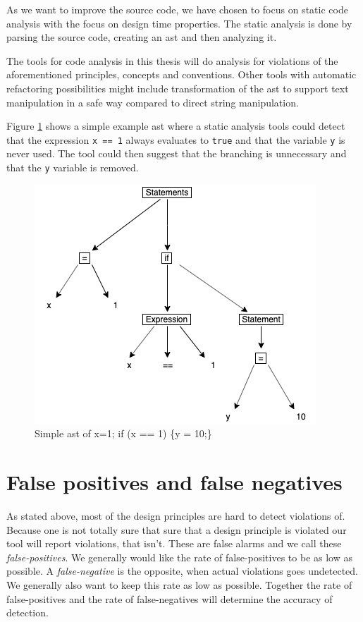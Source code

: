\documentclass{report}
\begin{document}
As we want to improve the source code, we have chosen to focus on static code analysis with the focus on design time properties. The static analysis is done by parsing the source code, creating an \gls{ast} and then analyzing it.


The tools for code analysis in this thesis will do analysis for violations of the aforementioned principles, concepts and conventions. Other tools with automatic refactoring possibilities might include transformation of the \gls{ast} to support text manipulation in a safe way compared to direct string manipulation. 




Figure \ref{fig:ast} shows a simple example \gls{ast} where a static analysis tools could detect that the expression \texttt{x == 1} always evaluates to \texttt{true} and that the variable \texttt{y} is never used. The tool could then suggest that the branching is unnecessary and that the \texttt{y} variable is removed.  

\begin{figure}[h!]
	\centering
	\includegraphics[width=\linewidth/2]{report/images/ast.png}
	\caption{Simple \gls{ast} of x=1; if (x == 1) \{y = 10;\}}
	\label{fig:ast}
\end{figure}



\section{False positives and false negatives}
As stated above, most of the design principles are hard to detect violations of. Because one is not totally sure that sure that a design principle is violated our tool will report violations, that isn't. These are false alarms and we call these \textit{false-positives}. We generally would like the rate of false-positives to be as low as possible. A \textit{false-negative} is the opposite, when actual violations goes undetected. We generally also want to keep this rate as low as possible. Together the rate of false-positives and the rate of false-negatives will determine the accuracy of detection. 
\end{document}
